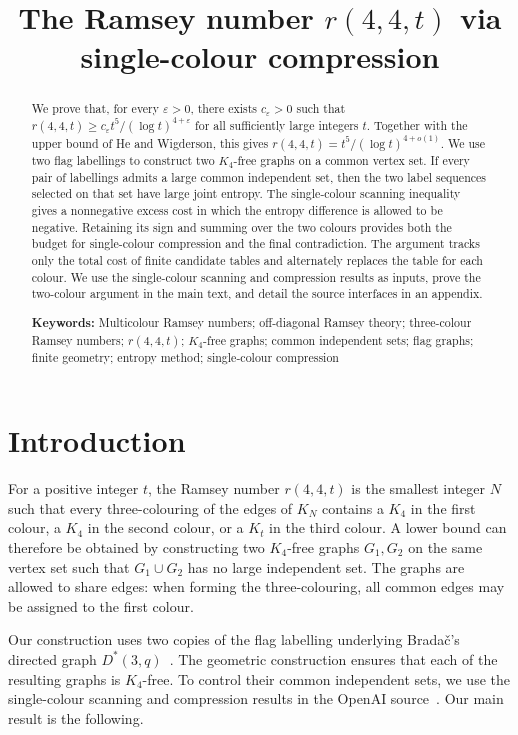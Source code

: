 \documentclass[11pt]{article}
\title{The Ramsey number $r(4,4,t)$ via single-colour compression}
\author{}
\date{}
\theoremstyle{definition}
\theoremstyle{remark}
\newcommand{\eps}{\varepsilon}
\begin{document}
\maketitle
\vspace{-2em}

\begin{abstract}
We prove that, for every $\eps>0$, there exists $c_\eps>0$ such that
$r(4,4,t)\ge c_\eps t^5/(\log t)^{4+\eps}$ for all sufficiently large
integers $t$. Together with the upper bound of He and Wigderson, this
gives $r(4,4,t)=t^5/(\log t)^{4+o(1)}$. We use two flag labellings to
construct two $K_4$-free graphs on a common vertex set. If every pair of
labellings admits a large common independent set, then the two label
sequences selected on that set have large joint entropy. The
single-colour scanning inequality gives a nonnegative excess cost in
which the entropy difference is allowed to be negative. Retaining its
sign and summing over the two colours provides both the budget for
single-colour compression and the final contradiction. The argument
tracks only the total cost of finite candidate tables and alternately
replaces the table for each colour. We use the single-colour scanning
and compression results as inputs, prove the two-colour argument in the
main text, and detail the source interfaces in an appendix.

\medskip
\noindent\textbf{Keywords:} Multicolour Ramsey numbers; off-diagonal
Ramsey theory; three-colour Ramsey numbers; $r(4,4,t)$; $K_4$-free
graphs; common independent sets; flag graphs; finite geometry;
entropy method; single-colour compression
\end{abstract}

\section{Introduction}\label{sec:introduction}

For a positive integer $t$, the Ramsey number $r(4,4,t)$ is the smallest
integer $N$ such that every three-colouring of the edges of $K_N$
contains a $K_4$ in the first colour, a $K_4$ in the second colour, or a
$K_t$ in the third colour. A lower bound can therefore be obtained by
constructing two $K_4$-free graphs $G_1,G_2$ on the same vertex set such
that $G_1\cup G_2$ has no large independent set. The graphs are allowed
to share edges: when forming the three-colouring, all common edges may
be assigned to the first colour.

Our construction uses two copies of the flag labelling underlying
Brada\v{c}'s directed graph $D^*(3,q)$~\cite{Bradac}. The geometric
construction ensures that each of the resulting graphs is $K_4$-free.
To control their common independent sets, we use the single-colour
scanning and compression results in the OpenAI
source~\cite{OAI-scan,OAI-step}. Our main result is the following.
\end{document}
